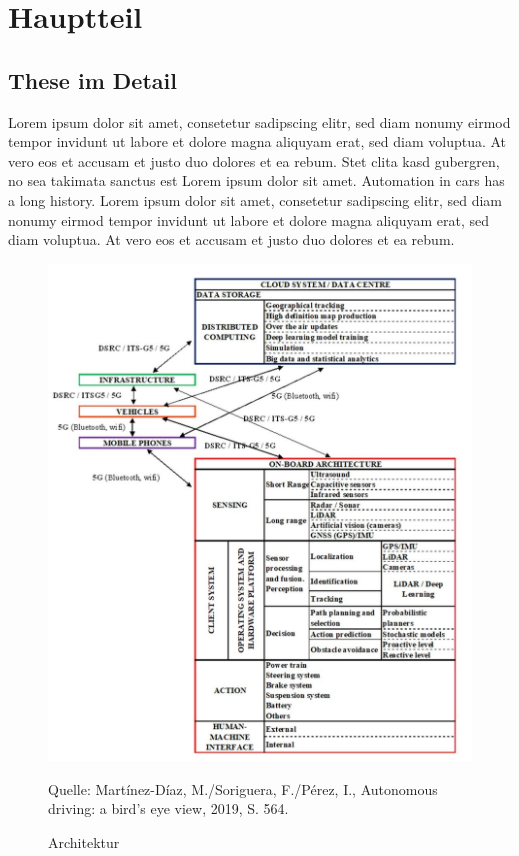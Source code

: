 \chapter{Hauptteil}





\section{These im Detail}

Lorem ipsum dolor sit amet, consetetur sadipscing elitr, sed diam nonumy eirmod tempor invidunt ut labore et dolore magna aliquyam erat, sed diam voluptua.
At vero eos et accusam et justo duo dolores et ea rebum.
Stet clita kasd gubergren, no sea takimata sanctus est Lorem ipsum dolor sit amet.
Automation in cars has a long history.  Lorem ipsum dolor sit amet, consetetur sadipscing elitr, sed diam nonumy eirmod tempor invidunt ut labore et dolore magna aliquyam erat, sed diam voluptua.
At vero eos et accusam et justo duo dolores et ea rebum.
\newline


\begin{figure}
	\caption[Architektur]{Architektur}
	\centering
	\includegraphics[]{assets/figures/Architektur.jpg}
	\begin{flushleft}
		Quelle: Martínez-Díaz, M./Soriguera, F./Pérez, I., Autonomous driving: a bird's eye view, 2019, S. 564.
	\end{flushleft}
\end{figure}


